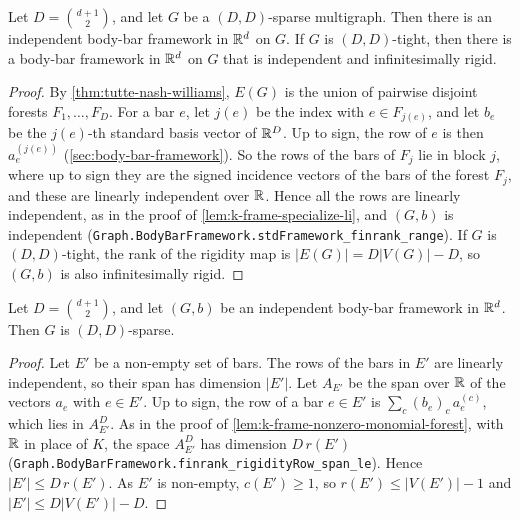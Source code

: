 \begin{proposition}
  \label{prop:tay-witness-exists}
  \leanok
  Let $D = \binom{d+1}{2}$, and let $G$ be a $(D, D)$-sparse
  multigraph. Then there is an independent body-bar framework in ${\mathbb{R}}^d$
  on $G$. If $G$ is $(D, D)$-tight, then there is a body-bar framework
  in ${\mathbb{R}}^d$ on $G$ that is independent and infinitesimally rigid.
\end{proposition}
\begin{proof}
  \leanok
  By \cref{thm:tutte-nash-williams}, $E(G)$ is the union of pairwise
  disjoint forests $F_1, \dots, F_D$. For a bar $e$, let $j(e)$ be the
  index with $e \in F_{j(e)}$, and let $b_e$ be the $j(e)$-th standard
  basis vector of ${\mathbb{R}}^D$. Up to sign, the row of $e$ is then
  $a_e^{(j(e))}$ (\cref{sec:body-bar-framework}). So the rows of the
  bars of $F_j$ lie in block $j$, where up to sign they are the signed
  incidence vectors of the bars of the forest $F_j$, and these are
  linearly independent over ${\mathbb{R}}$. Hence all the rows are linearly independent, as
  in the proof of \cref{lem:k-frame-specialize-li}, and $(G, b)$ is
  independent
  (\texttt{Graph.\allowbreak{}BodyBarFramework.\allowbreak{}stdFramework\_\allowbreak{}finrank\_\allowbreak{}range}).
  If $G$ is $(D, D)$-tight, the rank of the rigidity map is
  $|E(G)| = D|V(G)| - D$, so $(G, b)$ is also infinitesimally rigid.
\end{proof}

\begin{lemma}
  \label{lem:tay-isSparse-of-independent}
  \leanok
  Let $D = \binom{d+1}{2}$, and let $(G, b)$ be an independent body-bar
  framework in ${\mathbb{R}}^d$. Then $G$ is $(D, D)$-sparse.
\end{lemma}
\begin{proof}
  \leanok
  Let $E'$ be a non-empty set of bars. The rows of the bars in $E'$ are
  linearly independent, so their span has dimension $|E'|$. Let
  $A_{E'}$ be the span over ${\mathbb{R}}$ of the vectors $a_e$ with $e \in E'$.
  Up to sign, the row of a bar $e \in E'$ is
  $\sum_c (b_e)_c\, a_e^{(c)}$, which lies in $A_{E'}^D$. As in the
  proof of \cref{lem:k-frame-nonzero-monomial-forest}, with ${\mathbb{R}}$ in
  place of $K$, the space $A_{E'}^D$ has dimension $D\, r(E')$
  (\texttt{Graph.\allowbreak{}BodyBarFramework.\allowbreak{}finrank\_\allowbreak{}rigidityRow\_\allowbreak{}span\_\allowbreak{}le}).
  Hence $|E'| \le D\, r(E')$. As $E'$ is non-empty, $c(E') \ge 1$, so
  $r(E') \le |V(E')| - 1$ and $|E'| \le D|V(E')| - D$.
\end{proof}

